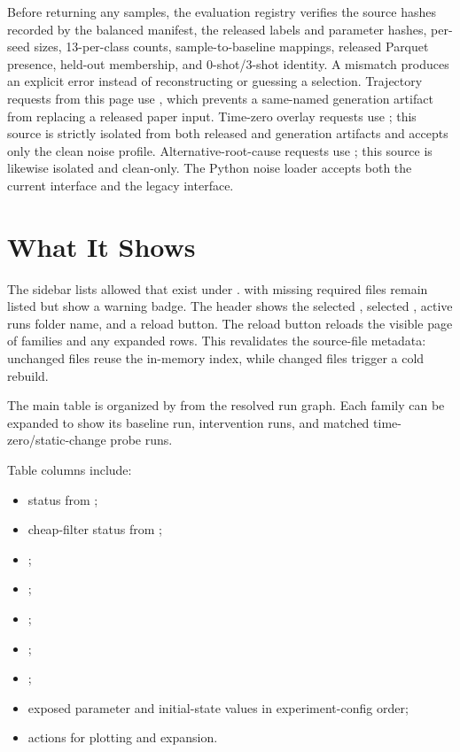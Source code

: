 \documentclass[11pt]{article}
\begin{document}
Before returning any samples, the evaluation registry verifies the source hashes recorded by the balanced manifest, the released labels and parameter hashes, per-seed sizes, 13-per-class counts, sample-to-baseline mappings, released Parquet presence, held-out membership, and 0-shot/3-shot identity.
A mismatch produces an explicit error instead of reconstructing or guessing a selection.
Trajectory requests from this page use , which prevents a same-named generation artifact from replacing a released paper input.
Time-zero overlay requests use ; this source is
strictly isolated from both released and generation artifacts and accepts only
the clean noise profile.
Alternative-root-cause requests use
; this source is likewise isolated and
clean-only.
The Python noise loader accepts both the current  interface and the legacy  interface.



\section*{What It Shows}

The sidebar lists allowed \name{} \termSimulators that exist under .
\termSimulators with missing required files remain listed but show a warning badge.
The header shows the selected \termSimulator, selected , active runs folder name, and a reload button. 
The reload button reloads the visible page of families and any expanded rows.
This revalidates the source-file metadata: unchanged files reuse the in-memory index, while changed files trigger a cold rebuild.

The main table is organized by  from the resolved run graph.
Each family can be expanded to show its baseline run, intervention runs, and matched time-zero/static-change probe runs.

Table columns include:

\begin{itemize}
\item status from ;
\item cheap-filter status from ;
\item {};
\item {};
\item {};
\item {};
\item {};
\item exposed parameter and initial-state values in experiment-config order;
\item actions for plotting and expansion.
\end{itemize}
\end{document}

